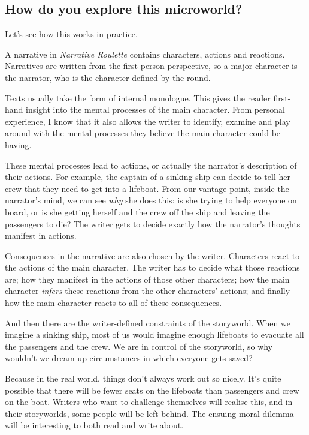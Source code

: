 \subsection{How do you explore this microworld?}

Let's see how this works in practice.

A narrative in \emph{Narrative Roulette} contains characters, actions
and reactions. Narratives are written from the first-person perspective,
so a major character is the narrator, who is the character defined by
the round.

Texts usually take the form of internal monologue. This gives the reader
first-hand insight into the mental processes of the main character. From personal experience, I know that it
also allows the writer to identify, examine and play around with the
mental processes they believe the main character could be having.

These mental processes lead to actions, or actually the narrator's
description of their actions. For example, the captain of a sinking ship
can decide to tell her crew that they need to get into a lifeboat. From
our vantage point, inside the narrator's mind, we can see \emph{why} she
does this: is she trying to help everyone on board, or is she getting
herself and the crew off the ship and leaving the passengers to die? The
writer gets to decide exactly how the narrator's thoughts manifest in
actions.

Consequences in the narrative are also chosen by the writer. Characters
react to the actions of the main character. The writer has to decide
what those reactions are; how they manifest in the actions of those
other characters; how the main character \emph{infers} these reactions
from the other characters' actions; and finally how the main character
reacts to all of these consequences.

And then there are the writer-defined constraints of the storyworld.
When we imagine a sinking ship, most of us would imagine enough
lifeboats to evacuate all the passengers and the crew. We are in control
of the storyworld, so why wouldn't we dream up circumstances in which
everyone gets saved?

Because in the real world, things don't always work out so nicely. It's
quite possible that there will be fewer seats on the lifeboats than
passengers and crew on the boat. Writers who want to challenge
themselves will realise this, and in their storyworlds, some people will
be left behind. The ensuing moral dilemma will be interesting to both
read and write about.

